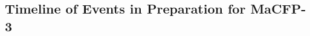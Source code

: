 \documentclass[12pt]{article}
\begin{document}

\subsection{Timeline of Events in Preparation for MaCFP-3}
\end{document}
